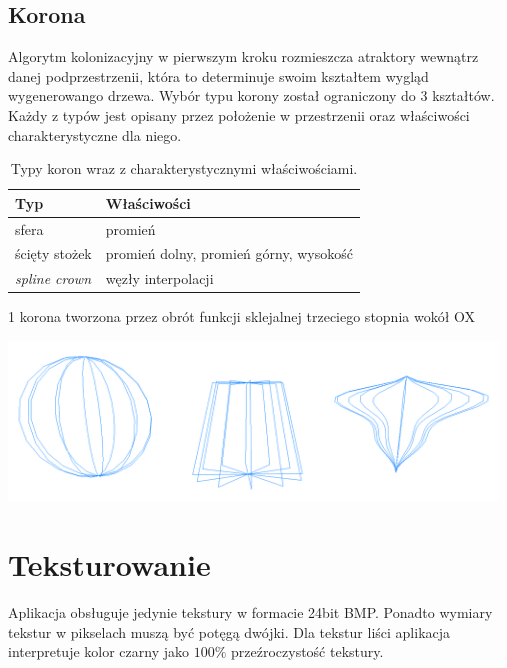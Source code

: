 \subsection{Korona}
Algorytm kolonizacyjny w pierwszym kroku rozmieszcza atraktory wewnątrz danej podprzestrzenii, która to determinuje swoim kształtem wygląd wygenerowango drzewa. Wybór typu korony został ograniczony do 3 kształtów. Każdy z typów jest opisany przez położenie w przestrzenii oraz właściwości charakterystyczne dla niego.

\begin{table}[h]
\begin{center}
\begin{threeparttable}
\begin{tabular}{| l | l |}
	\hline
	\textbf{Typ} & \textbf{Właściwości}\\
	\hline
	sfera & promień\\
	\hline
	ścięty stożek & promień dolny, promień górny, wysokość\\
	\hline
	\textit{spline crown\tnote{1}} & węzły interpolacji\\
	\hline
\end{tabular}

\begin{tablenotes}
	\item[1] korona tworzona przez obrót funkcji sklejalnej trzeciego stopnia wokół OX
\end{tablenotes}
\end{threeparttable}
\end{center}
\caption{Typy koron wraz z charakterystycznymi właściwościami.}
\end{table}
\begin{center}
	\includegraphics[width=130mm]{images/model/crowns.png}
	\label{crowns}
\end{center}

\section{Teksturowanie}
Aplikacja obsługuje jedynie tekstury w formacie 24bit BMP. 
Ponadto wymiary tekstur w pikselach muszą być potęgą dwójki.
Dla tekstur liści aplikacja interpretuje kolor czarny jako ${100\%}$ przeźroczystość tekstury.

